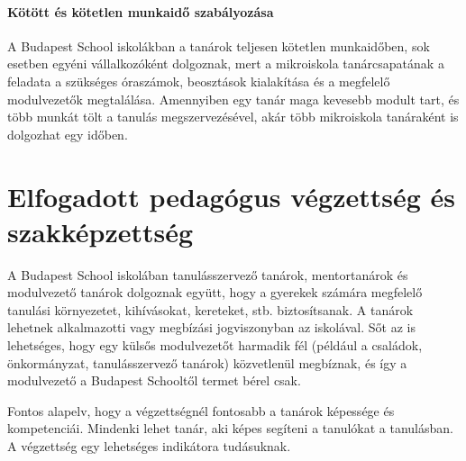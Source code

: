\paragraph{Kötött és kötetlen munkaidő szabályozása}

A Budapest School  iskolákban a tanárok teljesen kötetlen munkaidőben, sok esetben egyéni vállalkozóként dolgoznak, mert a mikroiskola tanárcsapatának a feladata a szükséges óraszámok, beosztások kialakítása és a megfelelő modulvezetők megtalálása. Amennyiben egy tanár maga kevesebb modult tart, és több munkát tölt a tanulás megszervezésével, akár több mikroiskola tanáraként is dolgozhat egy időben.

\section{Elfogadott pedagógus végzettség és szakképzettség}

A Budapest School iskolában tanulásszervező tanárok, mentortanárok és modulvezető tanárok dolgoznak együtt, hogy a gyerekek számára megfelelő tanulási környezetet, kihívásokat, kereteket, stb. biztosítsanak. A tanárok lehetnek alkalmazotti vagy megbízási jogviszonyban az iskolával. Sőt az is lehetséges, hogy egy külsős modulvezetőt harmadik fél (például a családok, önkormányzat, tanulásszervező tanárok) közvetlenül megbíznak, és így a modulvezető a Budapest Schooltől termet bérel csak.

Fontos alapelv, hogy a végzettségnél fontosabb a tanárok képessége és kompetenciái. Mindenki lehet tanár, aki képes segíteni a tanulókat a tanulásban. A végzettség egy lehetséges indikátora tudásuknak.

